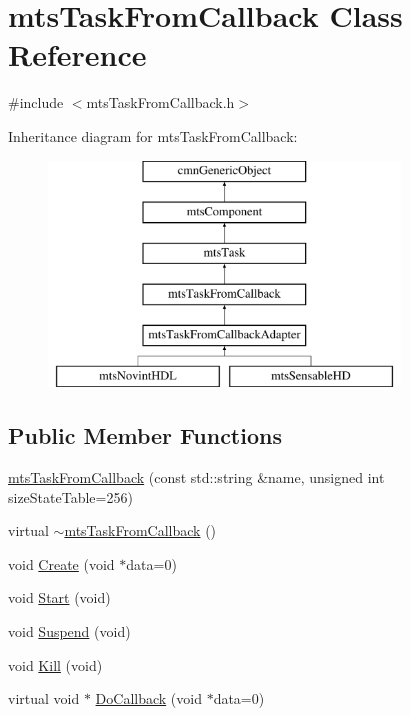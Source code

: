 \hypertarget{classmts_task_from_callback}{}\section{mts\+Task\+From\+Callback Class Reference}
\label{classmts_task_from_callback}


{\ttfamily \#include $<$mts\+Task\+From\+Callback.\+h$>$}

Inheritance diagram for mts\+Task\+From\+Callback\+:\begin{figure}[H]
\begin{center}
\leavevmode
\includegraphics[height=6.000000cm]{d7/d02/classmts_task_from_callback}
\end{center}
\end{figure}
\subsection*{Public Member Functions}
\begin{DoxyCompactItemize}
\item 
\hyperlink{classmts_task_from_callback_a42fde8ba0b610a7dde8edc540f2ac05e}{mts\+Task\+From\+Callback} (const std\+::string \&name, unsigned int size\+State\+Table=256)
\item 
virtual \hyperlink{classmts_task_from_callback_a6af1292436c5c06029742818a7be0eea}{$\sim$mts\+Task\+From\+Callback} ()
\item 
void \hyperlink{classmts_task_from_callback_ad167ac4fc56eb5559af44741cbc10600}{Create} (void $\ast$data=0)
\item 
void \hyperlink{classmts_task_from_callback_a420e3a65a5cb0bcd5adad46964a49892}{Start} (void)
\item 
void \hyperlink{classmts_task_from_callback_af084a18079cb3bb5e63556222f626e06}{Suspend} (void)
\item 
void \hyperlink{classmts_task_from_callback_ae5a5080d14be6175588bc98275070384}{Kill} (void)
\item 
virtual void $\ast$ \hyperlink{classmts_task_from_callback_ab2a10cb9dc0365bc2df219d5b702d9fc}{Do\+Callback} (void $\ast$data=0)
\end{DoxyCompactItemize}
